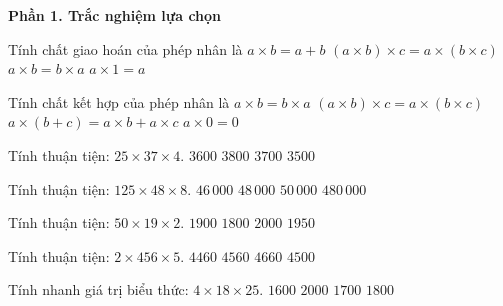 \textbf{Phần 1. Trắc nghiệm lựa chọn}

\begin{ex} %
Tính chất giao hoán của phép nhân là
\choice
{$a \times b = a + b$}
{$(a \times b) \times c = a \times (b \times c)$}
{\True $a \times b = b \times a$}
{$a \times 1 = a$}
\end{ex}

\begin{ex} %
Tính chất kết hợp của phép nhân là
\choice
{$a \times b = b \times a$}
{\True $(a \times b) \times c = a \times (b \times c)$}
{$a \times (b + c) = a \times b + a \times c$}
{$a \times 0 = 0$}
\end{ex}

\begin{ex} %
Tính thuận tiện: $25 \times 37 \times 4$.
\choice
{$3600$}
{$3800$}
{\True $3700$}
{$3500$}
\end{ex}

\begin{ex} %
Tính thuận tiện: $125 \times 48 \times 8$.
\choice
{$46\,000$}
{\True $48\,000$}
{$50\,000$}
{$480\,000$}
\end{ex}

\begin{ex} %
Tính thuận tiện: $50 \times 19 \times 2$.
\choice
{\True $1900$}
{$1800$}
{$2000$}
{$1950$}
\end{ex}

\begin{ex} %
Tính thuận tiện: $2 \times 456 \times 5$.
\choice
{$4460$}
{\True $4560$}
{$4660$}
{$4500$}
\end{ex}

\begin{ex} %
Tính nhanh giá trị biểu thức: $4 \times 18 \times 25$.
\choice
{$1600$}
{$2000$}
{$1700$}
{\True $1800$}
\end{ex}

